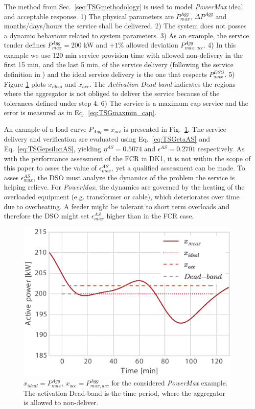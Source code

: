 The method from Sec.~\ref{sec:TSGmethodology} is used to model \textit{PowerMax} ideal and acceptable response. 1) The physical parameters are $P_{max}^{Agg}$, $\Delta P^{Agg}$ and months/days/hours the service shall be delivered. 2) The system does not posses a dynamic behaviour related to system parameters. 3) As an example, the service tender defines $P_{max}^{Agg} = 200$ kW and $+1\%$ allowed deviation $P_{max,acc}^{Agg}$. 4) In this example we use 120 min service provision time with allowed non-delivery in the first 15 min, and the last 5 min, of the service delivery (following the service definition in \cite{ding2013development}) and the ideal service delivery is the one that respects $P_{max}^{DSO}$. 5) Figure \ref{fig:PowerMaxSim} plots $x_{ideal}$ and $x_{acc}$. The \textit{Activation Dead-band} indicates the regions where the aggregator is not obliged to deliver the service because of the tolerances defined under step 4. 6) The service is a maximum cap service and the error is measured as in Eq.~\eqref{eq:TSGmaxmin_cap}.

An example of a load curve $P_{Agg}=x_{act}$ is presented in Fig.~\ref{fig:PowerMaxSim}. The service delivery and verification are evaluated using Eq.~\eqref{eq:TSGetaAS} and Eq.~\eqref{eq:TSGepsilonAS}, yielding $\eta^{AS} = 0.5074$ and $\epsilon^{AS} = 0.2701$ respectively. As with the performance assessment of the FCR in DK1, it is not within the scope of this paper to asses the value of $\epsilon^{AS}_{max}$, yet a qualified assessment can be made. %
To asses $\epsilon^{AS}_{max}$, the DSO must analyze the dynamics of the problem the service is helping relieve. For \textit{PowerMax}, the dynamics are governed by the heating of the overloaded equipment (e.g. transformer or cable), which deteriorates over time due to overheating. A feeder might be tolerant to short term overloads and therefore the DSO might set $\epsilon^{AS}_{max}$ higher than in the FCR case.

\begin{figure}
\centering
\includegraphics[width = 0.86\columnwidth]{graphics/tsg/powermaxsample2.eps}
\caption{$x_{ideal}=P_{max}^{Agg}$, $x_{acc}=P_{max,acc}^{Agg}$ for the considered \textit{PowerMax} example. The activation Dead-band is the time period, where the aggregator is allowed to non-deliver.}\label{fig:PowerMaxSim}
\end{figure}

